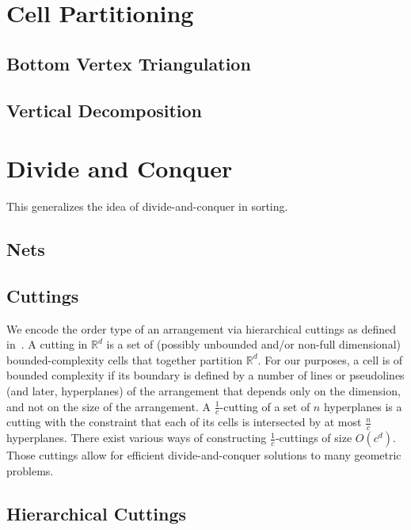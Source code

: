 \section{Cell Partitioning}

\subsection{Bottom Vertex Triangulation}

\subsection{Vertical Decomposition}


\section{Divide and Conquer}

This generalizes the idea of divide-and-conquer in sorting.

\subsection{Nets}

\subsection{Cuttings}

We encode the order type of an arrangement via
hierarchical cuttings as defined in~\cite{C93}. A cutting in \(\mathbb{R}^d\)
is a set of (possibly unbounded and/or non-full dimensional)
bounded-complexity cells that together partition \(\mathbb{R}^{d}\).
%
For our purposes, a cell is of bounded complexity if its boundary is defined by
a number of lines or pseudolines (and later, hyperplanes) of the arrangement
that depends only on the dimension, and not on the size of the arrangement.
%
A \(\frac{1}{c}\)-cutting of a set of \(n\) hyperplanes is a cutting with the
constraint that each of its cells is intersected by at most \(\frac{n}{c}\)
hyperplanes. There exist various ways of constructing \(\frac{1}{c}\)-cuttings of
size \(O(c^d)\).
Those cuttings allow for efficient divide-and-conquer
solutions to many geometric problems.


\subsection{Hierarchical Cuttings}




